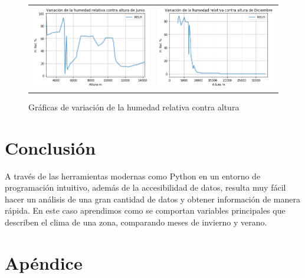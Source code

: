 \documentclass[a4paper]{article}
\begin{document}
\begin{figure}[h]
\begin{tabular}{ll}
\includegraphics[scale=0.5]{grafica9.png}
&
\includegraphics[scale=0.5]{grafica10.png}
\end{tabular}
\caption{Gráficas de variación de la humedad relativa contra altura}

\end{figure}


\section*{Conclusión}

A través de las herramientas modernas como Python en un entorno de programación intuitivo, además de la accesibilidad de datos, resulta muy fácil hacer un análisis de una gran cantidad de datos y obtener información de manera rápida. En este caso aprendimos como se comportan variables principales que describen el clima de una zona, comparando meses de invierno y verano.


\section*{Apéndice}
\end{document}

